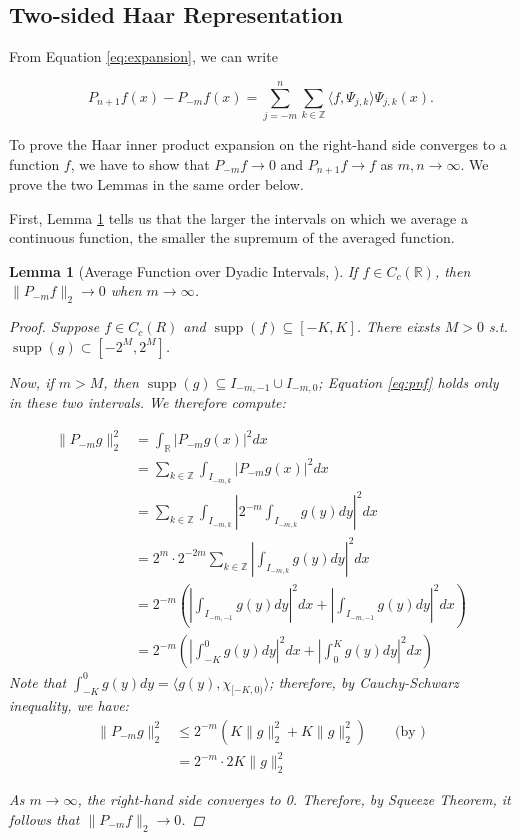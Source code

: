 \documentclass[11pt]{amsart}
\theoremstyle{theorem} %
\newtheorem{lem}[thm]{Lemma} %
\theoremstyle{definition}
\theoremstyle{example}
\theoremstyle{remark}
\numberwithin{equation}{section}
\newcommand{\R}{\mathbb{R}}
\newcommand{\Z}{\mathbb{Z}}
\DeclareMathOperator*{\supp}{supp}
\begin{document}
\subsection{Two-sided Haar Representation}
From Equation \ref{eq:expansion}, we can write

\begin{equation} \label{eq:twosided}
	P_{n+1}f(x) - P_{-m}f(x) = \sum_{j=-m}^{n} \sum_{k \in \Z} \langle f, \varPsi_{j,k} \rangle \varPsi_{j,k}(x).
\end{equation}

To prove the Haar inner product expansion on the right-hand side converges to a function $ f $, we have to show that $ P_{-m}f \to 0 $ and  $ P_{n+1}f \to f $ as $ m, n \to \infty $. We prove the two Lemmas in the same order below.

\vspace{8pt}
First, Lemma \ref{lem:average} tells us that the larger the intervals on which we average a continuous function, the smaller the supremum of the averaged function.

\begin{lem}[Average Function over Dyadic Intervals, {\cite[295]{pinsky}}] \label{lem:average}
	If $ f \in C_c(\R) $, then $ \|P_{-m}f\|_2 \to 0 $ when $ m \to \infty $.
	
	\begin{proof}
		Suppose $ f \in C_c(R) $ and $ \supp(f) \subseteq [-K,K] $. There eixsts $ M > 0 $ s.t. $ \supp(g) \subset [-2^M, 2^M] $.
		
		Now, if $ m > M $, then $ \supp(g) \subseteq I_{-m,-1} \cup I_{-m,0} $; Equation \ref{eq:pnf} holds only in these two intervals.
		We therefore compute:
		
		\begin{align*}
			\| P_{-m}g \|_2^2 &= \int_{\R} \left| P_{-m}g(x) \right|^2 dx \\
			&= \sum_{k \in \Z} \int_{I_{-m,k}} |P_{-m}g(x)|^2 dx \\
			&= \sum_{k \in \Z} \int_{I_{-m,k}} \left|2^{-m} \int_{I_{-m,k}} g(y) dy \right|^2 dx \\
			&= 2^{m} \cdot 2^{-2m} \sum_{k \in \Z} \left|\int_{I_{-m,k}} g(y) dy \right|^2 dx \\
			&= 2^{-m} \left( \left|\int_{I_{-m,-1}} g(y) dy \right|^2 dx + \left| \int_{I_{-m,-1}} g(y) dy \right|^2 dx \right) \\
			&=  2^{-m} \left( \left|\int_{-K}^0 g(y) dy \right|^2 dx + \left| \int_{0}^K g(y) dy \right|^2 dx \right)
		\end{align*}
		Note that $ \int_{-K}^0 g(y) dy = \langle g(y),\chi_{[-K,0)}  \rangle $; therefore, by Cauchy-Schwarz inequality, we have:
		\begin{align*}
		\| P_{-m}g \|_2^2	&\leq  2^{-m} \left( K \|g\|_2^2 + K \|g\|_2^2 \right) \qquad \text{(by )} \\
			&= 2^{-m} \cdot 2K \|g\|_2^2
		\end{align*}
		
		As $ m \to \infty $, the right-hand side converges to 0. Therefore, by Squeeze Theorem, it follows that $ \|P_{-m}f\|_2 \to 0 $.
	\end{proof}
\end{lem}
\end{document}
